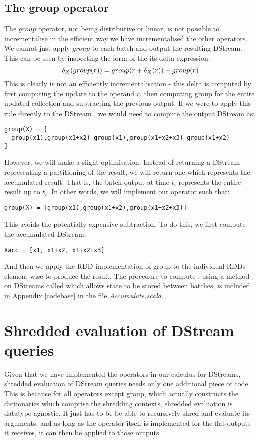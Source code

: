 \subsection{The group operator}
The $group$ operator, not being distributive or linear, is not possible to incrementalise in the efficient way we have incrementalised the other operators. We cannot just apply $group$ to each batch and output the resulting DStream. This can be seen by inspecting the form of the its delta expression:
\begin{equation*}
\delta_X(group(r)) = group(r + \delta_X(r)) - group(r)
\end{equation*}
This is clearly is not an efficiently incrementalisation - this delta is computed by first computing the update to the operand $r$, then computing group for the entire updated collection and subtracting the previous output. If we were to apply this rule directly to the DStream , we would need to compute the output DStream as:
\vs\begin{lstlisting}
group(X) = [
  group(x1),group(x1+x2)-group(x1),group(x1+x2+x3)-group(x1+x2)
]
\end{lstlisting}\vs
However, we will make a slight optimisation. Instead of returning a DStream representing a partitioning of the result, we will return one which represents the accumulated result. That is, the batch output at time $t_i$ represents the entire result up to $t_i$. In other words, we will implement our operator such that:
\vs\begin{lstlisting}
group(X) = [group(x1),group(x1+x2),group(x1+x2+x3)]
\end{lstlisting}\vs
This avoids the potentially expensive subtraction. To do this, we first compute the accumulated DStream:
\vs\begin{lstlisting}
Xacc = [x1, x1+x2, x1+x2+x3]
\end{lstlisting}
And then we apply the RDD implementation of group to the individual RDDs element-wise to produce the result. The procedure to compute , using a method on DStreams called  which allows state to be stored between batches, is included in Appendix \ref{codebase} in the file \textit{Accumulate.scala}.


\section{Shredded evaluation of DStream queries}
Given that we have implemented the operators in our calculus for DStreams, shredded evaluation of DStream queries needs only one additional piece of code. This is because for all operators except group, which actually constructs the dictionaries which comprise the shredding contexts, shredded evaluation is datatype-agnostic. It just has to be be able to recursively shred and evaluate its arguments, and as long as the operator itself is implemented for the flat outputs it receives, it can then be applied to those outputs.

